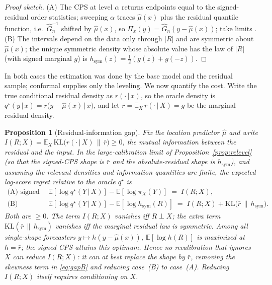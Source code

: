 \documentclass[11pt]{article}
\newtheorem{proposition}{Proposition}
\theoremstyle{definition}
\newcommand{\E}{\mathbb{E}}
\newcommand{\KL}{\mathrm{KL}}
\newcommand{\given}{\,\vert\,}
\begin{document}
\begin{proof}[Proof sketch]
(A) The CPS at level $\alpha$ returns endpoints equal to the signed-residual order
statistics; sweeping $\alpha$ traces $\hat\mu(x)$ plus the residual quantile function,
i.e.\ $\widehat G_n^{-1}$ shifted by $\hat\mu(x)$, so $\Pi_x(y)=\widehat G_n(y-\hat\mu(x))$;
take limits \citep{vovk2019nonparametric}. (B) The intervals depend on the data only
through $|R|$ and are symmetric about $\hat\mu(x)$; the unique symmetric density whose
absolute value has the law of $|R|$ (with signed marginal $g$) is
$h_{\mathrm{sym}}(z)=\tfrac12(g(z)+g(-z))$.
\end{proof}

In both cases the estimation was done by the base model and the residual sample; conformal
supplies only the leveling. We now quantify the cost. Write the true conditional residual
density as $r(\cdot\given x)$, so the oracle density is
$q^\star(y\given x)=r\big(y-\hat\mu(x)\given x\big)$, and let
$\bar r=\E_X\,r(\cdot\given X)=g$ be the marginal residual density.

\begin{proposition}[Residual-information gap]\label{prop:gap}
Fix the location predictor $\hat\mu$ and write
$I(R;X)=\E_X\,\KL\!\big(r(\cdot\given X)\,\|\,\bar r\big)\ge 0$, the mutual information
between the residual and the input. In the large-calibration limit of
Proposition~\ref{prop:relevel} (so that the signed-CPS shape is $\bar r$ and the
absolute-residual shape is $h_{\mathrm{sym}}$), and assuming the relevant densities and
information quantities are finite, the expected log-score regret relative to the oracle
$q^\star$ is
\begin{align}
  \text{(A) signed CPS:}\quad
  &\E[\log q^\star(Y\given X)]-\E[\log \pi_X(Y)] \;=\; I(R;X), \label{eq:gapA}\\[2pt]
  \text{(B) absolute intervals:}\quad
  &\E[\log q^\star(Y\given X)]-\E[\log h_{\mathrm{sym}}(R)] \;=\; I(R;X)
     +\KL\!\big(\bar r\,\|\,h_{\mathrm{sym}}\big). \label{eq:gapB}
\end{align}
Both are $\ge 0$. The term $I(R;X)$ vanishes iff $R\perp X$; the extra term
$\KL(\bar r\,\|\,h_{\mathrm{sym}})$ vanishes iff the marginal residual law is symmetric.
Among all single-shape forecasters $y\mapsto h(y-\hat\mu(x))$, $\E[\log h(R)]$ is maximized
at $h=\bar r$; the signed CPS attains this optimum. Hence no recalibration that ignores
$X$ can reduce $I(R;X)$: it can at best replace the shape by $\bar r$, removing the
skewness term in \eqref{eq:gapB} and reducing case~(B) to case~(A). Reducing $I(R;X)$
itself requires conditioning on $X$.
\end{proposition}
\end{document}
